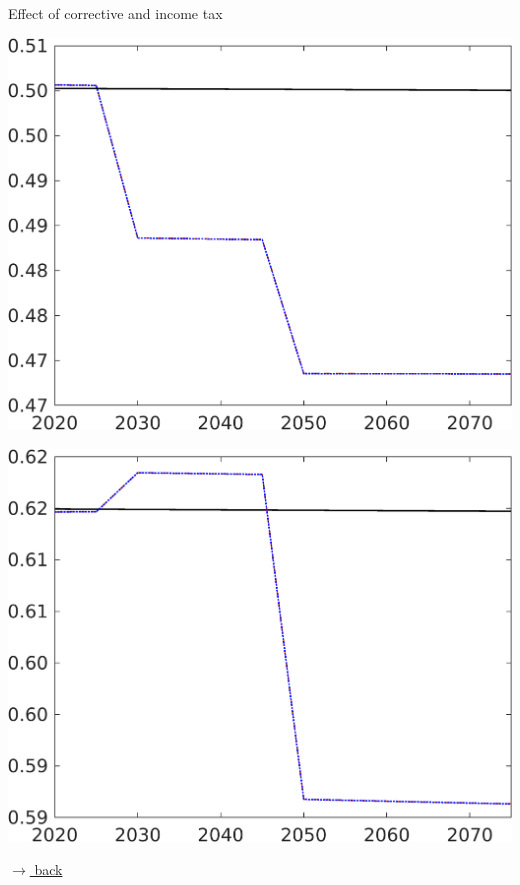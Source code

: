 \documentclass[11pt,aspectratio=169]{beamer}
\begin{document}
\begin{frame}{ Effect of corrective and income tax}
\begin{minipage}[]{0.3\textwidth}
	\end{minipage}
	\begin{minipage}[]{0.3\textwidth}
		\includegraphics[width=1\textwidth]{../codding_model/own_basedOnFried/optimalPol_elastS_DisuSci/figures/all_1705/CompCounterFac_withLF_taufopt1_taulopt0_EY_spillover0_noskill0_sep1_BN0_ineq0_red0_xgrowth0_etaa0.79_lgd0.png}
	\end{minipage}
	\begin{minipage}[]{0.3\textwidth}
		\includegraphics[width=1\textwidth]{../codding_model/own_basedOnFried/optimalPol_elastS_DisuSci/figures/all_1705/CompCounterFac_withLF_taufopt1_taulopt0_CY_spillover0_noskill0_sep1_BN0_ineq0_red0_xgrowth0_etaa0.79_lgd0.png}
	\end{minipage}
	
	\vspace{-1mm}
	\hfill
	\hyperlink{effalloback}{\tiny{$\rightarrow$ back}} 
\end{frame}
\end{document}
